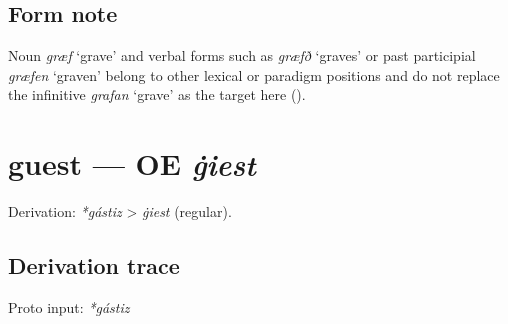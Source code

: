 \documentclass[
  british,
  a4paper,
  openany]{book}
\providecommand{\texorpdfstring}[2]{#1}
\begin{document}
\subsection{Form note}\label{form-note-4}

Noun \emph{græf} `grave' and verbal forms such as \emph{græfð} `graves'
or past participial \emph{græfen} `graven' belong to other lexical or
paradigm positions and do not replace the infinitive \emph{grafan}
`grave' as the target here ().

\section{\texorpdfstring{guest --- OE
\emph{ġiest}}{guest --- OE ġiest}}\label{guest-oe-ux121iest}


Derivation: \emph{*gástiz} \textgreater{} \emph{ġiest} (regular).

\subsection{Derivation trace}\label{derivation-trace-24}

Proto input: \emph{*gástiz}

\begingroup
\setlength{\fboxsep}{6pt}
\end{document}
